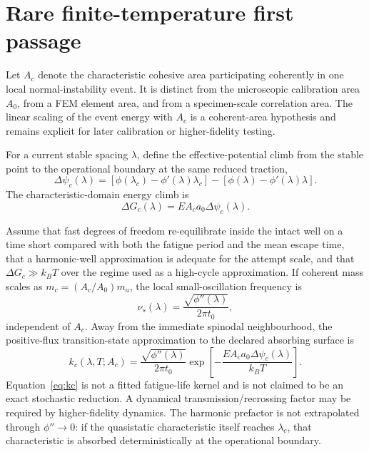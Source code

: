 \documentclass[11pt]{article}
\begin{document}
\section{Rare finite-temperature first passage}
Let $A_c$ denote the characteristic cohesive area participating coherently in one local normal-instability event. It is distinct from the microscopic calibration area $A_0$, from a FEM element area, and from a specimen-scale correlation area. The linear scaling of the event energy with $A_c$ is a coherent-area hypothesis and remains explicit for later calibration or higher-fidelity testing.

For a current stable spacing $\lambda$, define the effective-potential climb from the stable point to the operational boundary at the same reduced traction,
\begin{equation}
\Delta\psi_c(\lambda)
=\left[\phi(\lambda_c)-\phi'(\lambda)\lambda_c\right]
-\left[\phi(\lambda)-\phi'(\lambda)\lambda\right].
\label{eq:deltapsi}
\end{equation}
The characteristic-domain energy climb is
\begin{equation}
\Delta G_c(\lambda)=EA_ca_0\Delta\psi_c(\lambda).
\label{eq:DG}
\end{equation}

Assume that fast degrees of freedom re-equilibrate inside the intact well on a time short compared with both the fatigue period and the mean escape time, that a harmonic-well approximation is adequate for the attempt scale, and that $\Delta G_c\gg k_BT$ over the regime used as a high-cycle approximation. If coherent mass scales as $m_c=(A_c/A_0)m_a$, the local small-oscillation frequency is
\begin{equation}
\nu_s(\lambda)=\frac{\sqrt{\phi''(\lambda)}}{2\pi t_0},
\label{eq:nus}
\end{equation}
independent of $A_c$. Away from the immediate spinodal neighbourhood, the positive-flux transition-state approximation to the declared absorbing surface is
\begin{equation}
k_c(\lambda,T;A_c)
=\frac{\sqrt{\phi''(\lambda)}}{2\pi t_0}
\exp\left[-\frac{EA_ca_0\Delta\psi_c(\lambda)}{k_BT}\right].
\label{eq:kc}
\end{equation}
Equation~\eqref{eq:kc} is not a fitted fatigue-life kernel and is not claimed to be an exact stochastic reduction. A dynamical transmission/recrossing factor may be required by higher-fidelity dynamics. The harmonic prefactor is not extrapolated through $\phi''\to0$: if the quasistatic characteristic itself reaches $\lambda_c$, that characteristic is absorbed deterministically at the operational boundary.
\end{document}
